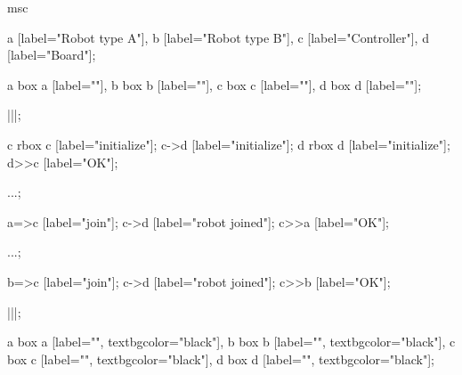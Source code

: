 \begin{msc}
msc
{

a [label="Robot type A"],
b [label="Robot type B"],
c [label="Controller"],
d [label="Board"];

a box a [label=""],
b box b [label=""],
c box c [label=""],
d box d [label=""];

|||;

c rbox c [label="initialize"];
c->d [label="initialize"];
d rbox d [label="initialize"];
d>>c [label="OK"];

...;

a=>c [label="join"];
c->d [label="robot joined"];
c>>a [label="OK"];

...;

b=>c [label="join"];
c->d [label="robot joined"];
c>>b [label="OK"];

|||;

a box a [label="", textbgcolor="black"],
b box b [label="", textbgcolor="black"],
c box c [label="", textbgcolor="black"],
d box d [label="", textbgcolor="black"];

}
\end{msc} 